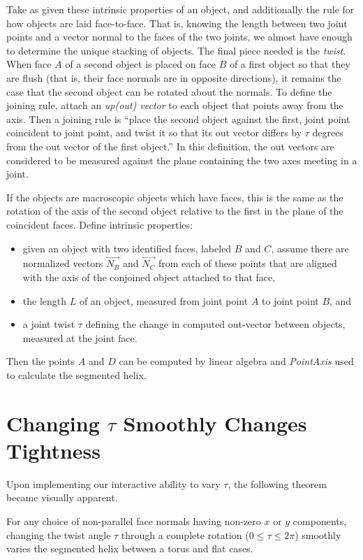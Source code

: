 \documentclass{svproc}
\begin{document}
Take as given these intrinsic properties of an object, and additionally the
rule for how objects are laid face-to-face. That is, knowing the length between two
joint points and a vector normal to the faces of the two joints, we almost have
enough to determine the unique stacking of objects. The final piece
needed is
the {\em twist}. When face $A$ of a second object is placed on face $B$
of a first object so that they are flush (that is, their face normals are in opposite directions),
it remains the case that the second object can be rotated about the normals. To
define the joining rule, attach an {\em up(out) vector} to each object that points away from the axis.
Then a joining
rule is ``place the second object against the first, joint point coincident to joint point,
and twist it so that its out vector differs by $\tau$ degrees from the out vector of the first
object.'' In this definition, the out vectors are considered to be measured against the plane
containing the two axes meeting in a joint.

If the objects are macroscopic objects which have faces, this is the same as the rotation
of the axis of the second object relative to the first in the plane of the coincident faces.
Define intrinsic properties:

\begin{itemize}
\item given an object with two identified faces, labeled $B$ and $C$, assume there are normalized
  vectors $\overrightarrow{N_B}$ and $\overrightarrow{N_C}$
  from each of these points that are aligned with the axis of the conjoined object attached to
  that face,
\item the length $L$ of an object, measured from joint point $A$ to joint point $B$, and
\item a joint twist $\tau$ defining the change in computed out-vector between objects,
  measured at the joint face.
\end{itemize}
Then the points $A$ and $D$ can be computed by linear algebra and {\em PointAxis} used to calculate the
segmented helix.

\section{Changing $\tau$ Smoothly Changes Tightness}

Upon implementing our interactive ability to vary $\tau$, the following
theorem became visually apparent.

\begin{theorem}
  For any choice of non-parallel face normals having non-zero $x$ or $y$ components,
  changing the twist angle $\tau$ through a complete rotation ($0 \leq \tau \leq 2\pi$)
  smoothly varies the segmented helix
  between a torus and flat cases.
\end{theorem}
\end{document}

